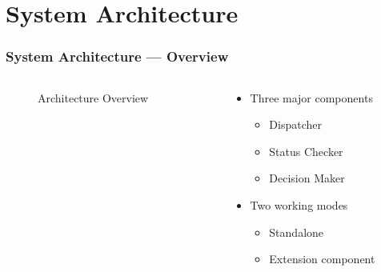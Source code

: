 \section{System Architecture}

\begin{frame}
  \frametitle{System Architecture --- Overview}
  \begin{columns}

    \begin{column}{.5\textwidth}
      \begin{figure}
        \resizebox{\linewidth}{!}{
          
        }
        \caption{Architecture Overview}
        \label{fig:archi-overview}
      \end{figure}
    \end{column}
    \begin{column}{.5\textwidth}
      \begin{itemize}
        \item Three major components
          \begin{itemize}
            \item Dispatcher
            \item Status Checker
            \item Decision Maker
          \end{itemize}
        \item Two working modes
          \begin{itemize}
            \item Standalone
            \item Extension component
          \end{itemize}
      \end{itemize}
    \end{column}

  \end{columns}
\end{frame}
